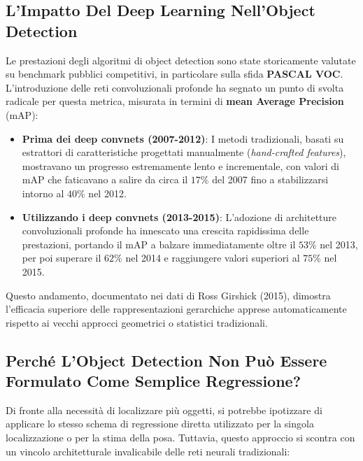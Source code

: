 ﻿\documentclass[11pt, a4paper]{article}
\begin{document}
\subsection{L'Impatto Del Deep Learning Nell'Object Detection}

Le prestazioni degli algoritmi di object detection sono state storicamente valutate su benchmark pubblici competitivi, in particolare sulla sfida \textbf{PASCAL VOC}. L'introduzione delle reti convoluzionali profonde ha segnato un punto di svolta radicale per questa metrica, misurata in termini di \textbf{mean Average Precision} (mAP):


\begin{itemize}[noitemsep]
    \item \textbf{Prima dei deep convnets (2007-2012)}: I metodi tradizionali, basati su estrattori di caratteristiche progettati manualmente (\emph{hand-crafted features}), mostravano un progresso estremamente lento e incrementale, con valori di mAP che faticavano a salire da circa il $17\%$ del 2007 fino a stabilizzarsi intorno al $40\%$ nel 2012.
    \item \textbf{Utilizzando i deep convnets (2013-2015)}: L'adozione di architetture convoluzionali profonde ha innescato una crescita rapidissima delle prestazioni, portando il mAP a balzare immediatamente oltre il $53\%$ nel 2013, per poi superare il $62\%$ nel 2014 e raggiungere valori superiori al $75\%$ nel 2015.
\end{itemize}

Questo andamento, documentato nei dati di Ross Girshick (2015), dimostra l'efficacia superiore delle rappresentazioni gerarchiche apprese automaticamente rispetto ai vecchi approcci geometrici o statistici tradizionali.

\newpage

\subsection{Perché L'Object Detection Non Può Essere Formulato Come Semplice Regressione?}

Di fronte alla necessità di localizzare più oggetti, si potrebbe ipotizzare di applicare lo stesso schema di regressione diretta utilizzato per la singola localizzazione o per la stima della posa. Tuttavia, questo approccio si scontra con un vincolo architetturale invalicabile delle reti neurali tradizionali:
\end{document}
